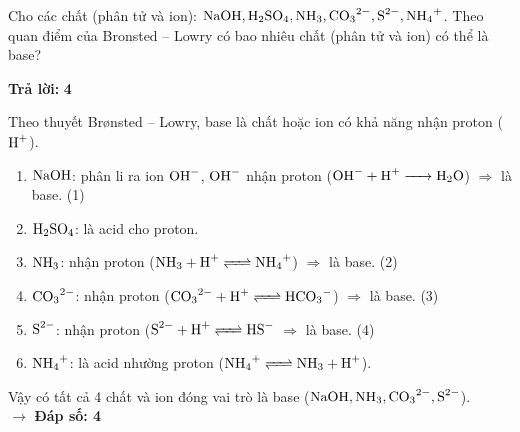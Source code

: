 \documentclass[11pt,a4paper]{article}
\begin{document}
\begin{ex}%
Cho các chất (phân tử và ion): $\ce{NaOH, H2SO4, NH3, CO3^{2-}, S^{2-}, NH4+}$. Theo quan điểm của Bronsted – Lowry có bao nhiêu chất (phân tử và ion) có thể là base?

\textbf{Trả lời: } \textbf{\color{hfRed}4}
\begin{loigiai}
Theo thuyết Brønsted -- Lowry, base là chất hoặc ion có khả năng nhận proton ($\ce{H+}$).
\begin{enumerate}
\item $\ce{NaOH}$: phân li ra ion $\ce{OH-}$, $\ce{OH-}$ nhận proton ($\ce{OH- + H+ -> H2O}$) $\Rightarrow$ là base. (1)
\item $\ce{H2SO4}$: là acid cho proton.
\item $\ce{NH3}$: nhận proton ($\ce{NH3 + H+ <=> NH4+}$) $\Rightarrow$ là base. (2)
\item $\ce{CO3^{2-}}$: nhận proton ($\ce{CO3^{2-} + H+ <=> HCO3-}$) $\Rightarrow$ là base. (3)
\item $\ce{S^{2-}}$: nhận proton ($\ce{S^{2-} + H+ <=> HS-}$ $\Rightarrow$ là base. (4)
\item $\ce{NH4+}$: là acid nhường proton ($\ce{NH4+ <=> NH3 + H+}$).
\end{enumerate}
Vậy có tất cả 4 chất và ion đóng vai trò là base ($\ce{NaOH, NH3, CO3^{2-}, S^{2-}}$).\\
$\rightarrow$ \textbf{Đáp số: 4}
\end{loigiai}
\end{ex}
\end{document}
